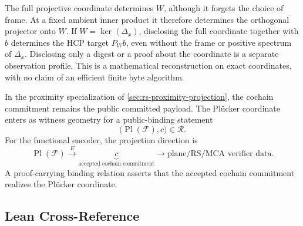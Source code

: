 The full projective coordinate determines \(W\), although it forgets the
choice of frame. At a fixed ambient inner product it therefore determines
the orthogonal projector onto \(W\). If \(W=\ker(\Delta_x)\), disclosing
the full coordinate together with \(b\) determines the HCP target
\(P_Wb\), even without the frame or positive spectrum of \(\Delta_x\).
Disclosing only a digest or a proof about the coordinate is a separate
observation profile. This is a mathematical reconstruction on exact
coordinates, with no claim of an efficient finite byte algorithm.

In the proximity specialization of \cref{sec:rs-proximity-projection}, the cochain
commitment remains the public committed payload. The Pl\"ucker coordinate enters
as witness geometry for a public-binding statement
\[
  \bigl(\operatorname{Pl}(\mathcal F),c\bigr)\in\mathcal R.
\]
For the functional encoder, the projection direction is
\[
  \operatorname{Pl}(\mathcal F)
  \xrightarrow{\ E\ }
  \underbrace{c}_{\text{accepted cochain commitment}}
  \longrightarrow
  \text{plane/RS/MCA verifier data}.
\]
A proof-carrying binding relation asserts that the accepted cochain commitment
realizes the Pl\"ucker coordinate.

\subsection*{Lean Cross-Reference}

